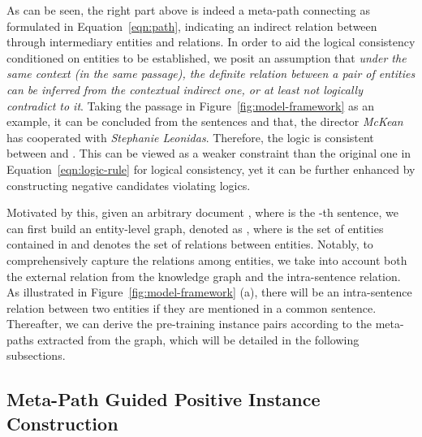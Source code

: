 As can be seen, the right part above is indeed a meta-path connecting  as formulated in Equation~\ref{eqn:path}, indicating an indirect relation between  through intermediary entities and relations.
In order to aid the logical consistency conditioned on entities to be established, we posit an  assumption that
\textit{under the same context (in the same passage), the definite relation between a  pair of entities can be inferred from the contextual indirect one, or at least not logically contradict to it}.
Taking the passage in Figure~\ref{fig:model-framework} as an example, 
it can be concluded from the sentences  and  that, the director \textit{McKean} has cooperated with \textit{Stephanie Leonidas}. 
Therefore, the logic is consistent between  and .
This can be viewed as a weaker constraint than the original one in Equation~\ref{eqn:logic-rule} for logical consistency, yet it can be further enhanced by constructing negative candidates violating logics.



Motivated by this, given an arbitrary document , where  is the -th sentence,
we can first build an entity-level graph, denoted as , where  is the set of entities contained in  and  denotes the set of relations between entities. 
Notably, to comprehensively capture the relations among entities, we take into account both the external relation from the knowledge graph and the intra-sentence relation. As illustrated in Figure~\ref{fig:model-framework} (a), there will be an intra-sentence relation between two entities if they are mentioned in a common sentence.
Thereafter, we can derive the pre-training instance pairs according to the meta-paths extracted from the graph, which will be detailed in the following subsections.




















\subsection{Meta-Path Guided Positive Instance Construction}
\label{sec:method:meta-path}



























